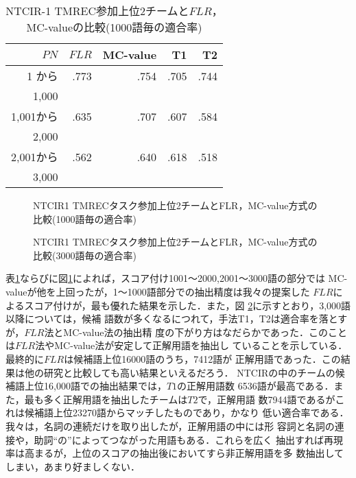 \begin{table}[htbp]
\caption{NTCIR-1 TMREC参加上位2チームと$FLR$，MC-valueの比較(1000語毎の適合率)}
\begin{center}
\begin{tabular}{|r|r|r|r|r|}
\hline
$PN$ &  $FLR$  & MC-value  & T1  & T2  \\ \hline
1 から  & .773 & .754 & .705& .744 \\
1,000 &      &      &      &      \\ \hline
1,001から  & .635 & .707 & .607 & .584 \\
2,000   &      &      &      &      \\ \hline
2,001から  & .562& .640 & .618 & .518 \\
3,000      &      &      &      &      \\ \hline
\end{tabular}
\end{center}
\label{table:pre}
\end{table}
\begin{figure}[htbp]
\hspace*{\fill}
\hspace*{\fill}
\caption{NTCIR1 TMRECタスク参加上位2チームとFLR，MC-value方式の比較(1000語毎の適合率)}
\label{fig:Prec1k}
\end{figure}
\begin{figure}[htbp]
\hspace*{\fill}
\hspace*{\fill}
\caption{NTCIR1 TMRECタスク参加上位2チームとFLR，MC-value方式の比較(3000語毎の適合率)}
\label{fig:Prec3k}
\end{figure}


表\ref{table:pre}ならびに図\ref{fig:Prec1k}によれば，スコア付け1001〜2000,2001〜3000語の部分では
MC-valueが他を上回ったが，1〜1000語部分での抽出精度は我々の提案した
$FLR$によるスコア付けが，最も優れた結果を示した．また，図
\ref{fig:Prec3k}に示すとおり，3,000語以降については，候補
語数が多くなるにつれて，手法T1，T2は適合率を落とすが，$FLR$法とMC-value法の抽出精
度の下がり方はなだらかであった．このことは$FLR$法やMC-value法が安定して正解用語を抽出し
ていることを示している．最終的に$FLR$は候補語上位16000語のうち，7412語が
正解用語であった．この結果は他の研究と比較しても高い結果といえるだろう．
NTCIRの中のチームの候補語上位16,000語での抽出結果では，$T1$の正解用語数
6536語が最高である．また，最も多く正解用語を抽出したチームは$T2$で，正解用語
数7944語であるがこれは候補語上位23270語からマッチしたものであり，かなり
低い適合率である．我々は，名詞の連続だけを取り出したが，正解用語の中には形
容詞と名詞の連接や，助詞``の''によってつながった用語もある．これらを広く
抽出すれば再現率は高まるが，上位のスコアの抽出後においてすら非正解用語を多
数抽出してしまい，あまり好ましくない．





